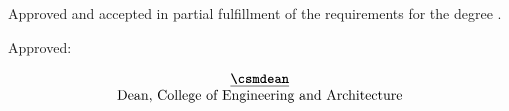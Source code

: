 {\noindent Approved and accepted  in partial fulfillment of the requirements for the degree { \program}.

\noindent Approved:\vspace{0.5in}
\begin{flushleft}
	$$
	\begin{array}{ccc}
		&\underline{\text{\bf \csmdean}}&\\
		&\text{Dean, College of Engineering and Architecture}&\\
		&\text{}
	\end{array}
	$$
\end{flushleft}



}